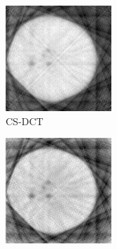 \documentclass[journal]{IEEEtran}
\begin{document}
\begin{figure}[!h]
\begin{subfigure}[b]{0.24\linewidth}
        \includegraphics[width=\textwidth]{../images/potato/2D/cs_dct.png}
        \caption{CS-DCT}
     \end{subfigure}
    \begin{subfigure}[b]{0.24\linewidth}
        \includegraphics[width=\textwidth]{../images/potato/2D/cs_wavelet.png}

\end{subfigure}
\end{figure}
\end{document}
